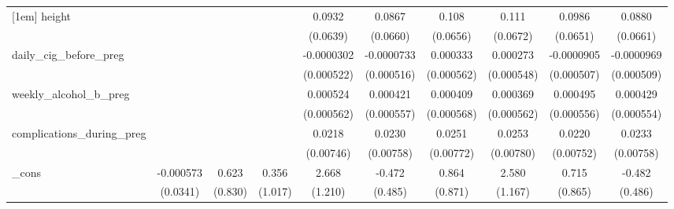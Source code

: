 \begin{table}[htbp]
\begin{tabular}{l*{9}{c}}
[1em]
height      &                     &                     &                     &      0.0932         &      0.0867         &       0.108         &       0.111\sym{*}  &      0.0986         &      0.0880         \\
            &                     &                     &                     &    (0.0639)         &    (0.0660)         &    (0.0656)         &    (0.0672)         &    (0.0651)         &    (0.0661)         \\
[1em]
daily\_cig\_before\_preg&                     &                     &                     &  -0.0000302         &  -0.0000733         &    0.000333         &    0.000273         &  -0.0000905         &  -0.0000969         \\
            &                     &                     &                     &  (0.000522)         &  (0.000516)         &  (0.000562)         &  (0.000548)         &  (0.000507)         &  (0.000509)         \\
[1em]
weekly\_alcohol\_b\_preg&                     &                     &                     &    0.000524         &    0.000421         &    0.000409         &    0.000369         &    0.000495         &    0.000429         \\
            &                     &                     &                     &  (0.000562)         &  (0.000557)         &  (0.000568)         &  (0.000562)         &  (0.000556)         &  (0.000554)         \\
[1em]
complications\_during\_preg&                     &                     &                     &      0.0218\sym{***}&      0.0230\sym{***}&      0.0251\sym{***}&      0.0253\sym{***}&      0.0220\sym{***}&      0.0233\sym{***}\\
            &                     &                     &                     &   (0.00746)         &   (0.00758)         &   (0.00772)         &   (0.00780)         &   (0.00752)         &   (0.00758)         \\
[1em]
\_cons      &   -0.000573         &       0.623         &       0.356         &       2.668\sym{**} &      -0.472         &       0.864         &       2.580\sym{**} &       0.715         &      -0.482         \\
            &    (0.0341)         &     (0.830)         &     (1.017)         &     (1.210)         &     (0.485)         &     (0.871)         &     (1.167)         &     (0.865)         &     (0.486)         \\
\hline

\end{tabular}
\end{table}
